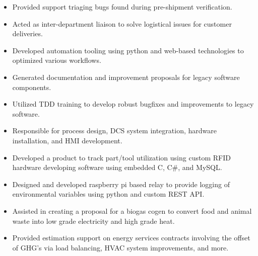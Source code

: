 \documentclass[a4paper,ragged2e,withhyper]{altacv}
\begin{document}
\begin{itemize}
\item Provided support triaging bugs found during pre-shipment verification.\\
\item Acted as inter-department liaison to solve logistical issues for customer deliveries.\\
\item Developed automation tooling using python and web-based technologies to optimized various workflows.\\
\item Generated documentation and improvement proposals for legacy software components.\\
\item Utilized TDD training to develop robust bugfixes and improvements to legacy software.\\
\end{itemize}

\divider


\begin{itemize}
\item Responsible for process design, DCS system integration, hardware installation, and HMI development.\\
\item Developed a product to track part/tool utilization using custom RFID hardware developing software using embedded C, C\#, and MySQL.\\
\end{itemize}

\divider


\begin{itemize}
\item Designed and developed raspberry pi based relay to provide logging of environmental variables using python and custom REST API.\\
\item Assisted in creating a proposal for a biogas cogen to convert food and animal waste into low grade electricity and high grade heat.\\
\item Provided estimation support on energy services contracts involving the offset of GHG's via load balancing, HVAC system improvements, and more.\\
\end{itemize}
\end{document}
